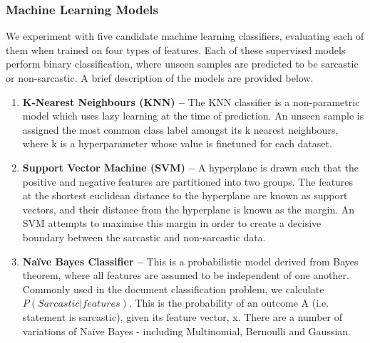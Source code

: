 \documentclass[12pt,a4paper]{article}
\begin{document}
\subsubsection{Machine Learning Models}
We experiment with five candidate machine learning classifiers, evaluating each of them when trained on four types of features. Each of these supervised models perform binary classification, where unseen samples are predicted to be sarcastic or non-sarcastic. A brief description of the models are provided below. 

\begin{enumerate}
	\item \textbf{K-Nearest Neighbours (KNN) --} The KNN classifier is a non-parametric model which uses lazy learning at the time of prediction. An unseen sample is assigned the most common class label amongst its k nearest neighbours, where k is a hyperparameter whose value is finetuned for each dataset.
	
	
	\item \textbf{Support Vector Machine (SVM) --} A hyperplane is drawn such that the positive and negative features are partitioned into two groups. The features at the shortest euclidean distance to the hyperplane are known as support vectors, and their distance from the hyperplane is known as the margin. An SVM attempts to maximise this margin in order to create a decisive boundary between the sarcastic and non-sarcastic data.
	
	\item \textbf{Na\"{i}ve Bayes Classifier --} This is a probabilistic model derived from Bayes theorem, where all features are assumed to be independent of one another. Commonly used in the document classification problem, we calculate ${P(Sarcastic | features)}$. This is  the probability of an outcome A (i.e. statement is sarcastic), given its feature vector, x. There are a number of variations of Na\"{i}ve Bayes - including Multinomial, Bernoulli and Gaussian. 


\end{enumerate}
\end{document}
